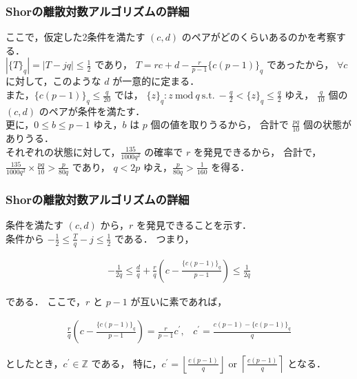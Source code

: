 \documentclass[dvipdfmx,12pt]{beamer}
\begin{document}
\begin{frame}
    
\frametitle{Shorの離散対数アルゴリズムの詳細}
    
ここで，仮定した2条件を満たす $ (c, d) $ のペアがどのくらいあるのかを考察する．\\
$ | \{ T \}_q | = | T - jq | \leq \frac{1}{2} $ であり，
$ T = rc + d - \frac{r}{p - 1} \{ c(p - 1)\}_q $ であったから，
$ \forall c $ に対して，このような $ d $ が一意的に定まる． \\
また，$ \{ c(p - 1) \}_q \leq \frac{q}{20} $ では，
$ \displaystyle \{ z \}_q : z \ \mathrm{mod} \ q \ \mathrm{s.t.} \ - \frac{q}{2} < \{ z \}_q \leq \frac{q}{2} $ ゆえ，
$ \frac{q}{10} $ 個の $ (c, d) $ のペアが条件を満たす．\\
更に，$ 0 \leq b \leq p - 1 $ ゆえ，$ b $ は $p$ 個の値を取りうるから，
合計で $ \frac{pq}{10} $ 個の状態がありうる．\\
それぞれの状態に対して，$ \frac{135}{1000q^2} $ の確率で $r$ を発見できるから，
合計で，$ \frac{135}{1000q^2} \times \frac{pq}{10} > \frac{p}{80q} $ であり，
$ q < 2p $ ゆえ，$ \frac{p}{80q} > \frac{1}{160} $ を得る．
    
\end{frame}


\begin{frame}
    
\frametitle{Shorの離散対数アルゴリズムの詳細}

条件を満たす $ (c, d) $ から，$r$ を発見できることを示す．\\
条件から $ \displaystyle - \frac{1}{2} \leq \frac{T}{q} - j \leq \frac{1}{2} $ である．
つまり，\vspace{-15pt}

\begin{align*}
    \displaystyle - \frac{1}{2 q} \leq \frac{d}{q} + \frac{r}{q} \left( c - \frac{ \{ c(p - 1) \}_q }{p - 1} \right) \leq \frac{1}{2 q}
\end{align*}

である．
ここで，$r$ と $p - 1$ が互いに素であれば，\vspace{-10pt}

\begin{align*}
    \displaystyle \frac{r}{q} \left( c - \frac{ \{ c(p - 1) \}_q }{p - 1} \right) = \frac{r}{p - 1} c^{\prime}, \hspace{10pt} c^{\prime} = \frac{c(p - 1) - \{ c(p - 1) \}_q }{q}
\end{align*}

としたとき，$ c^{\prime} \in \mathbb{Z} $ である，
特に，$ \displaystyle c^{\prime} = \left \lfloor \frac{c(p - 1)}{q} \right \rfloor $ or $ \displaystyle \left \lceil \frac{c(p - 1)}{q} \right \rceil $ となる．
    
\end{frame}
\end{document}
